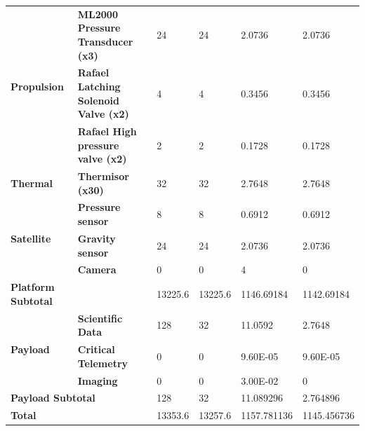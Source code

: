 \documentclass[a4paper, 11pt, conference]{IEEEtran}
\begin{document}
\begin{table}[H]
\begin{sideways}
\begin{tabular}{ll|ll|ll|}
\multicolumn{1}{|l|}{\multirow{3}{*}{\textbf{Propulsion}}} & \textbf{ML2000 Pressure Transducer (x3)} & \multicolumn{1}{l|}{24} & 24 & \multicolumn{1}{l|}{2.0736} & 2.0736 \\
\multicolumn{1}{|l|}{} & \textbf{Rafael Latching Solenoid Valve (x2)} & \multicolumn{1}{l|}{4} & 4 & \multicolumn{1}{l|}{0.3456} & 0.3456 \\
\multicolumn{1}{|l|}{} & \textbf{Rafael High pressure valve (x2)} & \multicolumn{1}{l|}{2} & 2 & \multicolumn{1}{l|}{0.1728} & 0.1728 \\

\multicolumn{1}{|l|}{\textbf{Thermal}} & \textbf{Thermisor (x30)} & \multicolumn{1}{l|}{32} & 32 & \multicolumn{1}{l|}{2.7648} & 2.7648 \\

\multicolumn{1}{|l|}{\multirow{3}{*}{\textbf{Satellite}}} & \textbf{Pressure sensor} & \multicolumn{1}{l|}{8} & 8 & \multicolumn{1}{l|}{0.6912} & 0.6912 \\
\multicolumn{1}{|l|}{} & \textbf{Gravity sensor} & \multicolumn{1}{l|}{24} & 24 & \multicolumn{1}{l|}{2.0736} & 2.0736 \\
\multicolumn{1}{|l|}{} & \textbf{Camera} & \multicolumn{1}{l|}{0} & 0 & \multicolumn{1}{l|}{4} & 0 \\ \hline

\multicolumn{1}{|l|}{\textbf{Platform Subtotal}} &  & \multicolumn{1}{l|}{13225.6} & 13225.6 & \multicolumn{1}{l|}{1146.69184} & 1142.69184 \\ \hline

\multicolumn{1}{|l|}{\multirow{3}{*}{\textbf{Payload}}} & \textbf{Scientific Data} & \multicolumn{1}{l|}{128} & 32 & \multicolumn{1}{l|}{11.0592} & 2.7648 \\
\multicolumn{1}{|l|}{} & \textbf{Critical Telemetry} & \multicolumn{1}{l|}{0} & 0 & \multicolumn{1}{l|}{9.60E-05} & 9.60E-05 \\
\multicolumn{1}{|l|}{} & \textbf{Imaging} & \multicolumn{1}{l|}{0} & 0 & \multicolumn{1}{l|}{3.00E-02} & 0 \\ \hline

\multicolumn{2}{|l|}{\textbf{Payload Subtotal}} & \multicolumn{1}{l|}{128} & 32 & \multicolumn{1}{l|}{11.089296} & 2.764896 \\ \hline

\multicolumn{2}{|l|}{\textbf{Total}} & \multicolumn{1}{l|}{13353.6} & 13257.6 & \multicolumn{1}{l|}{1157.781136} & 1145.456736 \\ \hline

\end{tabular}
\end{sideways}
\end{table}
\end{document}
